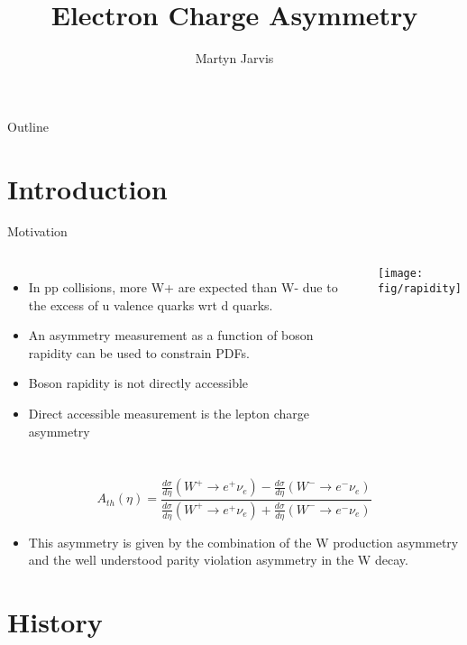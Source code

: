 \documentclass[t, 8pt]{beamer}
\author{Martyn Jarvis}
\title[Electron Charge Asymmetry]{Electron Charge Asymmetry}
\begin{document}
\begin{frame}
  \titlepage
\end{frame}

\begin{frame}{Outline}
  \tableofcontents
\end{frame}

\section{Introduction}

\begin{frame}{Motivation}
  \begin{columns}[c]
  \begin{itemize}
    \item In pp collisions, more W+ are expected than W- due to the excess of u valence quarks wrt d quarks.
    \item An asymmetry measurement as a function of boson rapidity can be used to constrain PDFs.
    \item Boson rapidity is not directly accessible
    \item Direct accessible measurement is the lepton charge asymmetry
  \end{itemize}
    \texttt{[image: fig/rapidity]}
  \end{columns}

    \begin{equation}
    A_{th}(\eta) = \frac{\frac{d\sigma}{d\eta}(W^{+}\to e^{+}\nu_{e}) - \frac{d\sigma}{d\eta}(W^{-}\to e^{-}\nu_{e})}
                        {\frac{d\sigma}{d\eta}(W^{+}\to e^{+}\nu_{e}) + \frac{d\sigma}{d\eta}(W^{-}\to e^{-}\nu_{e})}
    \end{equation}
  \begin{itemize}
    \item This asymmetry is given by the combination of the W production asymmetry and the well understood parity violation asymmetry in the W decay.
  \end{itemize}
\end{frame}

\section{History}
\end{document}
